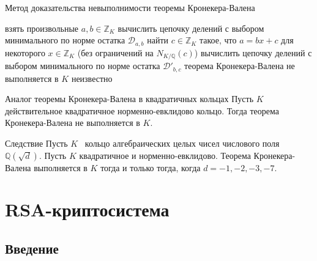 \documentclass[8pt, xcolor=x11names]{beamer}
\begin{document}
\begin{frame}
    \begin{block}{Метод доказательства невыполнимости теоремы Кронекера-Валена}
        \begin{algorithmic}[1]
            \State взять произвольные $a, b\in\mathbb{Z}_K$
            \State вычислить цепочку делений с выбором минимального по норме остатка $\mathcal{D}_{a, b}$
            \State найти $c\in\mathbb{Z}_K$ такое, что $a = bx+c$ для некоторого $x\in\mathbb{Z}_K$ (без ограничений на $N_{K/\mathbb{Q}}(c)$)
            \State вычислить цепочку делений с выбором минимального по норме остатка $\mathcal{D}'_{b,c}$
                \State теорема Кронекера-Валена не выполняется в $K$
            \Else
                \State неизвестно
            \EndIf
        \end{algorithmic}
    \end{block}

    \begin{block}{Аналог теоремы Кронекера-Валена в квадратичных кольцах}
        Пусть $K$ действительное квадратичное норменно-евклидово кольцо.
        Тогда теорема Кронекера-Валена не выполняется в $K$.
    \end{block}

    \begin{block}{Следствие}
        Пусть $K$ \textendash\ кольцо алгебраических целых чисел числового поля $\mathbb{Q}(\sqrt{d})$.
        Пусть $K$ квадратичное и норменно-евклидово.
        Теорема Кронекера-Валена выполняется в $K$ тогда и только тогда, когда $d=-1, -2, -3, -7$.
    \end{block}
\end{frame}

\section{RSA-криптосистема}

\subsection{Введение}
\end{document}
